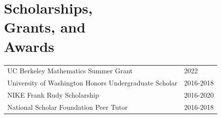 
\section{\sc Scholarships,\\ Grants, and \\ Awards}
\begin{tabular}{@{}p{4in}p{2in}}
UC Berkeley Mathematics Summer Grant & 2022 \\
University of Washington Honors Undergraduate Scholar & 2016-2018\\
NIKE Frank Rudy Scholarship & 2016-2020 \\
National Scholar Foundation Peer Tutor & 2016-2018 \\
\end{tabular}
\endinput